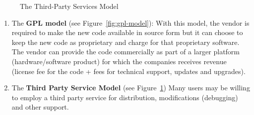\begin{figure}[ht]\centering
 \caption{The Third-Party Services Model}\label{fig:tps-model}
\end{figure}

\begin{enumerate}
\item The \textbf{GPL model} (see Figure~\ref{fig:gpl-model}): With this model, the vendor
  is required to make the new code available in source form but it can choose to keep the
  new code as proprietary and charge for that proprietary software.  The vendor can
  provide the code commercially as part of a larger platform (hardware/software product)
  for which the companies receives revenue (license fee for the code + fees for technical
  support, updates and upgrades).
\item The \textbf{Third Party Service Model} (see Figure~\ref{fig:tps-model}) Many users
  may be willing to employ a third party service for distribution, modifications
  (debugging) and other support.
\end{enumerate}


